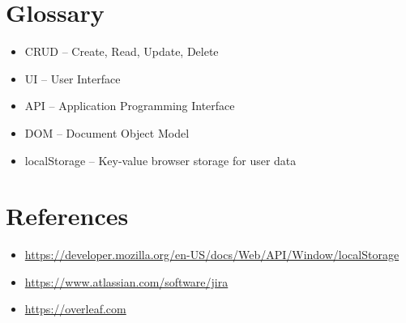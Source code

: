 \documentclass[12pt]{article}
\begin{document}
\section{Glossary}
\begin{itemize}
    \item CRUD – Create, Read, Update, Delete
    \item UI – User Interface
    \item API – Application Programming Interface
    \item DOM – Document Object Model
    \item localStorage – Key-value browser storage for user data
\end{itemize}

\section{References}
\begin{itemize}
    \item \url{https://developer.mozilla.org/en-US/docs/Web/API/Window/localStorage}
    \item \url{https://www.atlassian.com/software/jira}
    \item \url{https://overleaf.com}
\end{itemize}
\end{document}
